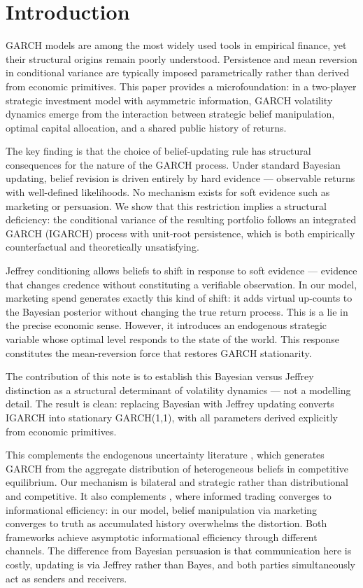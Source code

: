 \documentclass[12pt,a4paper]{article}
\newcommand{\1}{\mathbf{1}}
\begin{document}
\section{Introduction}
\label{sec:intro}

GARCH models are among the most widely used tools in empirical finance,
yet their structural origins remain poorly understood. Persistence and
mean reversion in conditional variance are typically imposed
parametrically rather than derived from economic primitives. This paper
provides a microfoundation: in a two-player strategic investment model
with asymmetric information, GARCH volatility dynamics emerge from the
interaction between strategic belief manipulation, optimal capital
allocation, and a shared public history of returns.

The key finding is that the choice of belief-updating rule has
structural consequences for the nature of the GARCH process. Under
standard Bayesian updating, belief revision is driven entirely by
hard evidence --- observable returns with well-defined likelihoods.
No mechanism exists for soft evidence such as marketing or persuasion.
We show that this restriction implies a structural deficiency: the
conditional variance of the resulting portfolio follows an integrated
GARCH (IGARCH) process with unit-root persistence, which is both
empirically counterfactual and theoretically unsatisfying.

Jeffrey conditioning \citep{Jeffrey1965} allows beliefs to shift in
response to soft evidence --- evidence that changes credence without
constituting a verifiable observation. In our model, marketing spend
generates exactly this kind of shift: it adds virtual up-counts to
the Bayesian posterior without changing the true return process. This
is a lie in the precise economic sense. However, it introduces an
endogenous strategic variable whose optimal level responds to the
state of the world. This response constitutes the mean-reversion force
that restores GARCH stationarity.

The contribution of this note is to establish this Bayesian versus
Jeffrey distinction as a structural determinant of volatility dynamics
--- not a modelling detail. The result is clean: replacing Bayesian
with Jeffrey updating converts IGARCH into stationary GARCH(1,1),
with all parameters derived explicitly from economic primitives.

This complements the endogenous uncertainty literature
\citep{Kurz1994, KurzMotolese2001}, which generates GARCH from the
aggregate distribution of heterogeneous beliefs in competitive
equilibrium. Our mechanism is bilateral and strategic rather than
distributional and competitive. It also complements \citet{Kyle1985},
where informed trading converges to informational efficiency: in our
model, belief manipulation via marketing converges to truth as
accumulated history overwhelms the distortion. Both frameworks
achieve asymptotic informational efficiency through different channels.
The difference from Bayesian persuasion \citep{KamenicaGentzkow2011}
is that communication here is costly, updating is via Jeffrey rather
than Bayes, and both parties simultaneously act as senders and
receivers.
\end{document}
